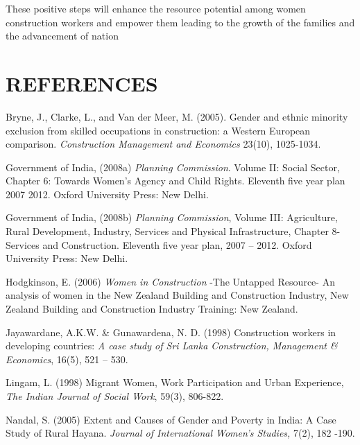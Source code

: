\documentclass[12pt]{report}
\begin{document}
	These positive  steps  will  enhance  the  resource  potential  among  women  construction  workers and  empower  them  leading  to  the  growth  of  the  families  and  the  advancement  of nation
	
	
	
	
	
	\chapter*{REFERENCES}
	
	\begin{description}
		\item Bryne,  J.,  Clarke,  L.,  and  Van  der  Meer,  M.  (2005).  Gender  and  ethnic  minority exclusion  from  skilled  occupations  in  construction:  a  Western  European comparison.  \textit{Construction  Management  and  Economics}  23(10),  1025-1034.
		
		\item Government  of  India,  (2008a)  \textit{Planning  Commission}.  Volume  II:  Social  Sector,  Chapter 6:  Towards  Women’s  Agency  and  Child  Rights.  Eleventh  five  year  plan  2007  2012. Oxford  University  Press:  New  Delhi.
		
		\item Government  of  India,  (2008b) \textit{ Planning  Commission},  Volume  III:  Agriculture,  Rural Development,  Industry,  Services  and  Physical  Infrastructure,  Chapter  8-  Services and  Construction.    Eleventh  five  year  plan,  2007  –  2012.  Oxford  University Press:  New  Delhi.
		
		\item Hodgkinson,  E.  (2006)    \textit{Women  in  Construction}  -The  Untapped  Resource-  An  analysis  of women  in  the  New  Zealand  Building  and  Construction  Industry,  New  Zealand Building  and  Construction  Industry  Training: New  Zealand.
		
		\item Jayawardane,  A.K.W.  \&  Gunawardena,  N.  D.  (1998)  Construction  workers  in  developing countries:  \textit{A  case  study  of  Sri  Lanka  Construction,  Management  \&  Economics}, 16(5),  521  –  530.
		
		\item Lingam,  L.  (1998)  Migrant  Women,  Work  Participation  and  Urban  Experience,  \textit{The Indian  Journal  of  Social  Work},  59(3),  806-822.
		
		\item  Nandal,  S.  (2005)  Extent  and  Causes  of  Gender  and  Poverty  in  India:  A  Case  Study  of Rural  Hayana.  \textit{Journal  of  International  Women’s  Studies,}  7(2),  182  -190.
		

\end{description}
\end{document}
